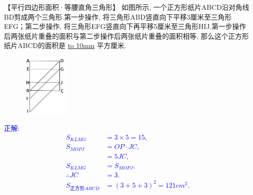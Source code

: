 \item {
    【平行四边形面积·等腰直角三角形】
    {如图所示, 一个正方形纸片ABCD沿对角线BD剪成两个三角形.第一步操作, 将三角形ABD竖直向下平移3厘米至三角形EFG；第二步操作, 将三角形EFG竖直向下再平移5厘米至三角形HIJ.第一步操作后两张纸片重叠的面积与第二步操作后两张纸片重叠的面积相等, 那么这个正方形纸片ABCD的面积是 \underline{\hbox to 10mm{}} 平方厘米.} 
    \begin{figure}[H] 
        \centering
        \includegraphics[width=0.2\textwidth]{./pics/Chapter_2/10.png}
    \end{figure}
    \ifshowSolution 
        \fangsong{}\textcolor{blue}{
            正解: \\
            \begin{align*}
                S_{KLMG} &= 3\times 5 = 15, \\
                S_{MOPJ} &= OP\cdot JC, \\
                &= 5JC, \\
                S_{KLMG} &= S_{MOPJ},\\
                \therefore JC &= 3.\\
                S_{正方形ABCD} &= (3+5+3)^2 = 121 {cm}^2.\\
            \end{align*}
        }
    \else
        \vspace{1cm}
    \fi
}

